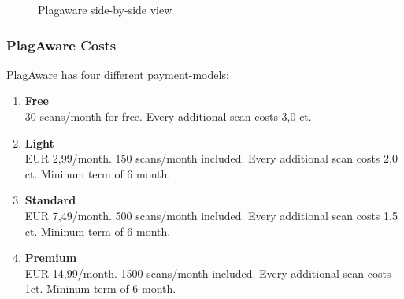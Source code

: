  \begin{figure}[!h]
  \centering
  \caption{Plagaware side-by-side view}
  \label{fig:plagaware_side_by_side}
\end{figure}


\newpage
\subsubsection*{PlagAware Costs}
PlagAware has four different payment-models:
\begin{enumerate}
\item \textbf{Free}\\
30 scans/month for free. Every additional scan costs 3,0 ct. 
\item \textbf{Light}\\
EUR 2,99/month. 150 scans/month included. Every additional scan costs 2,0 ct. Mininum term of 6 month.
\item \textbf{Standard}\\
EUR 7,49/month. 500 scans/month included. Every additional scan costs 1,5 ct. Mininum term of 6 month.
\item \textbf{Premium}\\
EUR 14,99/month. 1500 scans/month included. Every additional scan costs 1ct. Mininum term of 6 month.
\end{enumerate}



\newpage
